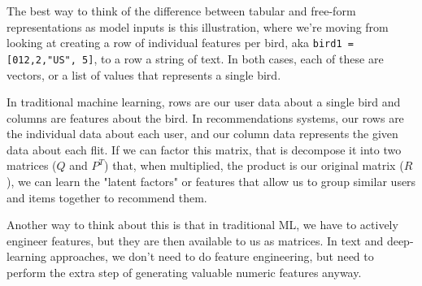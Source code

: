 \documentclass[11pt, table]{diazessay} %
\begin{document}
\begin{sloppypar}
The best way to think of the difference between tabular and free-form representations as model inputs is this illustration, where we're moving from looking at creating a row of individual features per bird, aka \texttt{bird1 = [012,2,"US", 5]}, to a row a string of text. In both cases, each of these are vectors, or a list of values that represents a single bird. 

In traditional machine learning, rows are our user data about a single bird and columns are features about the bird. In recommendations systems, our rows are the individual data about each user, and our column data represents the given data about each flit.  If we can factor this matrix, that is decompose it into two matrices ($Q$ and $P^T$) that, when multiplied, the product is our original matrix ($R$), we can learn the "latent factors" or features that allow us to group similar users and items together to recommend them. 

Another way to think about this is that in traditional ML, we have to actively engineer features, but they are then available to us as matrices. In text and deep-learning approaches, we don't need to do feature engineering, but need to perform the extra step of generating valuable numeric features anyway. 


\end{sloppypar}
\end{document}
